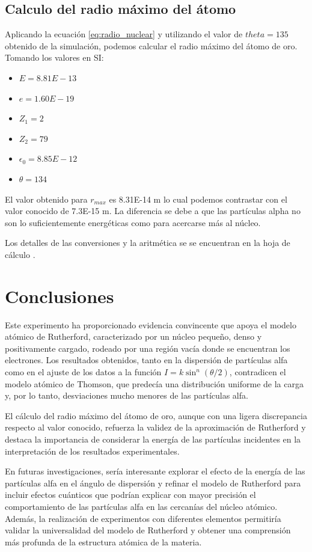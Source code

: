 \documentclass[twocolumn,a4paper,11pt]{scrartcl}
\begin{document}
\subsection*{Calculo del radio máximo del átomo}
Aplicando la ecuación \ref{eq:radio_nuclear} y utilizando el valor de $theta=135$ obtenido de la simulación, podemos calcular el radio máximo del átomo de oro.
Tomando los valores en SI:
\begin{itemize}
  \item $E=8.81E-13$
  \item $e=1.60E-19$
  \item $Z_1=2$
  \item $Z_2=79$
  \item $\epsilon_0=8.85E-12$
  \item $\theta = 134$
\end{itemize}

El valor obtenido para $r_{max}$ es 8.31E-14 m lo cual podemos contrastar con el valor conocido de 7.3E-15 m. La diferencia se debe a que las partículas alpha no son lo suficientemente energéticas como para acercarse más al núcleo.

Los detalles de las conversiones y la aritmética se se encuentran en la hoja de cálculo \cite{HojaCalculo}.


\section{Conclusiones}
Este experimento ha proporcionado evidencia convincente que apoya el modelo atómico de Rutherford, caracterizado por un núcleo pequeño, denso y positivamente cargado, rodeado por una región vacía donde se encuentran los electrones. Los resultados obtenidos, tanto en la dispersión de partículas alfa como en el ajuste de los datos a la función $I = k \sin^n (\theta/2)$, contradicen el modelo atómico de Thomson, que predecía una distribución uniforme de la carga y, por lo tanto, desviaciones mucho menores de las partículas alfa.

El cálculo del radio máximo del átomo de oro, aunque con una ligera discrepancia respecto al valor conocido, refuerza la validez de la aproximación de Rutherford y destaca la importancia de considerar la energía de las partículas incidentes en la interpretación de los resultados experimentales.

En futuras investigaciones, sería interesante explorar el efecto de la energía de las partículas alfa en el ángulo de dispersión y refinar el modelo de Rutherford para incluir efectos cuánticos que podrían explicar con mayor precisión el comportamiento de las partículas alfa en las cercanías del núcleo atómico. Además, la realización de experimentos con diferentes elementos permitiría validar la universalidad del modelo de Rutherford y obtener una comprensión más profunda de la estructura atómica de la materia.



\end{document}
